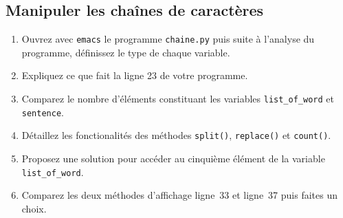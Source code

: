 


\subsection{Manipuler les chaînes de caractères}


\begin{enumerate}

\item Ouvrez avec  \texttt{emacs} le  programme \texttt{chaine.py} puis
  suite à l'analyse du programme, définissez le type de chaque variable.

\item Expliquez ce que fait la ligne 23 de votre programme.
  
\item Comparez le nombre d'éléments constituant les variables \texttt{list\_of\_word} et  \texttt{sentence}.

\item Détaillez les fonctionalités des méthodes \texttt{split()}, \texttt{replace()} et \texttt{count()}.
  
\item Proposez une solution pour accéder au cinquième élément de la variable \texttt{list\_of\_word}.

\item Comparez les deux méthodes d'affichage ligne~33 et ligne~37 puis faites un choix.


\end{enumerate}
